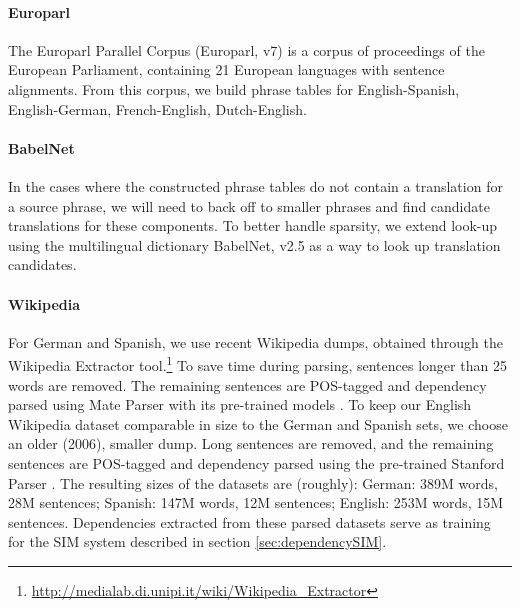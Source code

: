\documentclass[11pt]{article}
\begin{document}
\paragraph{Europarl}  %
The Europarl Parallel Corpus (Europarl, v7) \cite{koehn:05} is a corpus of proceedings of the European Parliament, containing 21 European languages with sentence alignments.
From this corpus, we build phrase tables for English-Spanish, English-German, French-English, Dutch-English.

\paragraph{BabelNet} %

In the cases where the constructed phrase tables do not contain a translation
for a source phrase, we will need to back off to smaller phrases and find
candidate translations for these components.  To better handle sparsity, we
extend look-up using the multilingual dictionary BabelNet, v2.5
\cite{Navigli:Ponzetto:12} as a way to look up translation candidates.

\paragraph{Wikipedia} %


For German and Spanish, we use recent Wikipedia dumps, obtained through the Wikipedia Extractor tool.\footnote{\url{http://medialab.di.unipi.it/wiki/Wikipedia_Extractor}} To save time during parsing, sentences longer than 25 words are removed. The remaining sentences are POS-tagged and dependency parsed using Mate Parser with its pre-trained models \cite{bohnet:10,bohnet:kuhn:12,seeker:kuhn:13}. To keep our English Wikipedia dataset comparable in size to the German and Spanish sets, we choose an older (2006), smaller dump. Long sentences are removed, and the remaining sentences are POS-tagged and dependency parsed using the pre-trained Stanford Parser \cite{klein:manning:03,marneffe:maccartney:ea:06}. The resulting sizes of the datasets are (roughly): German: 389M words, 28M sentences; Spanish: 147M words, 12M sentences; English: 253M words, 15M sentences. Dependencies extracted from these parsed datasets serve as training for the SIM system described in section \ref{sec:dependencySIM}.
\end{document}

